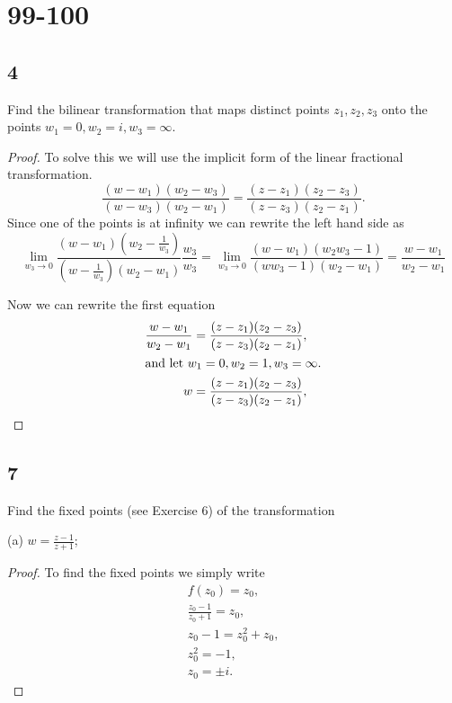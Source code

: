 \documentclass{article}
\begin{document}
\section*{99-100}
\subsection*{4} %
Find the bilinear transformation that maps distinct points $z_1, z_2, z_3$ onto the
points $w_1 = 0, w_2 = i, w_3=\infty$.

\begin{proof}
    To solve this we will use the implicit form of the linear fractional
    transformation.
    \begin{equation*}
        \frac{(w-w_1)(w_2-w_3)}{(w-w_3)(w_2-w_1)} = \frac{(z-z_1)(z_2-z_3)}{(z-z_3)(z_2-z_1)}.
    \end{equation*}
    Since one of the points is at infinity we can rewrite the left hand side as
    \begin{equation*}
        \lim_{w_3\to0} \frac{(w-w_1)(w_2-\frac{1}{w_3})}{(w-\frac{1}{w_3})(w_2-w_1)}\frac{w_3}{w_3}
        =\lim_{w_3\to0} \frac{(w-w_1)(w_2w_3 - 1)}{(ww_3 - 1)(w_2-w_1)}
        = \frac{w-w_1}{w_2-w_1}
    \end{equation*}

    Now we can rewrite the first equation
    \begin{align*}
        \frac{w-w_1}{w_2-w_1} & =  \frac{(z-z_1)(z_2-z_3)}{(z-z_3)(z_2-z_1)}, \\
        \intertext{and let $w_1 = 0, w_2 = 1, w_3=\infty$.}
        w                     & = \frac{(z-z_1)(z_2-z_3)}{(z-z_3)(z_2-z_1)},  \\
    \end{align*}
\end{proof}

\subsection*{7} %
Find the fixed points (see Exercise 6) of the transformation

(a) $w = \frac{z-1}{z+1}$;
\begin{proof}
    To find the fixed points we simply write
    \begin{gather*}
        f(z_0) = z_0, \\
        \frac{z_0 -1}{z_0+1} = z_0,\\
        z_0 -1 =  z_0^2 + z_0,\\
        z_0^2 = -1,\\
        z_0 = \pm i.
    \end{gather*}
\end{proof}
\end{document}
